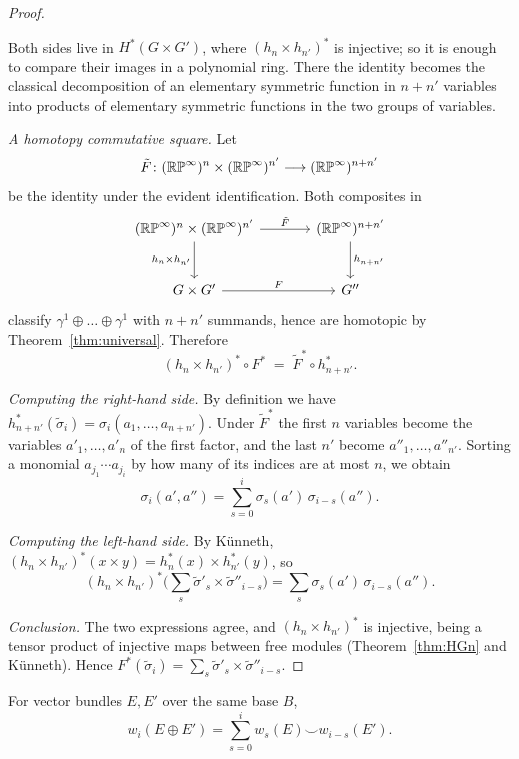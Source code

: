 \begin{proof}
\begin{strategy}
Both sides live in $H^*(G\times G')$, where $(h_n\times h_{n'})^*$ is injective;
so it is enough to compare their images in a polynomial ring. There the identity
becomes the classical decomposition of an elementary symmetric function in
$n+n'$ variables into products of elementary symmetric functions in the two
groups of variables.
\end{strategy}

 \emph{A homotopy commutative square.} Let
\[
\tilde F\colon(\mathbb{RP}^\infty)^n\times(\mathbb{RP}^\infty)^{n'}
\longrightarrow(\mathbb{RP}^\infty)^{n+n'}
\]
be the identity under the evident identification. Both composites in
\[
\begin{tikzcd}[row sep=large, column sep=large]
(\RP^\infty)^n\times(\RP^\infty)^{n'}
\arrow[r,"\tilde F"] \arrow[d,"h_n\times h_{n'}"']
& (\RP^\infty)^{n+n'} \arrow[d,"h_{n+n'}"]\\
G\times G' \arrow[r,"F"] & G''
\end{tikzcd}
\]
classify $\gamma^1\oplus\dots\oplus\gamma^1$ with $n+n'$ summands, hence are
homotopic by Theorem~\ref{thm:universal}. Therefore
\[
(h_n\times h_{n'})^*\circ F^* \;=\; \tilde F^*\circ h_{n+n'}^* .
\]

 \emph{Computing the right-hand side.} By definition we have
$h_{n+n'}^*(\tilde\sigma_i)=\sigma_i(a_1,\dots,a_{n+n'})$. Under $\tilde F^*$
the first $n$ variables become the variables $a'_1,\dots,a'_n$ of the first
factor, and the last $n'$ become $a''_1,\dots,a''_{n'}$. Sorting a monomial
$a_{j_1}\cdots a_{j_i}$ by how many of its indices are at most $n$, we obtain
\[
\sigma_i(a',a'')=\sum_{s=0}^{i}\sigma_s(a')\,\sigma_{i-s}(a'').
\]

 \emph{Computing the left-hand side.} By K\"unneth,
$(h_n\times h_{n'})^*(x\times y)=h_n^*(x)\times h_{n'}^*(y)$, so
\[
(h_n\times h_{n'})^*\Big(\sum_s\tilde\sigma'_s\times\tilde\sigma''_{i-s}\Big)
=\sum_s\sigma_s(a')\,\sigma_{i-s}(a'').
\]

 \emph{Conclusion.} The two expressions agree, and
$(h_n\times h_{n'})^*$ is injective, being a tensor product of injective maps
between free modules (Theorem~\ref{thm:HGn} and K\"unneth). Hence
$F^*(\tilde\sigma_i)=\sum_s\tilde\sigma'_s\times\tilde\sigma''_{i-s}$.
\end{proof}

\begin{theorem}\label{thm:whitney}
For vector bundles $E,E'$ over the same base $B$,
\[
w_i(E\oplus E')=\sum_{s=0}^{i}w_s(E)\smile w_{i-s}(E').
\]
\end{theorem}

